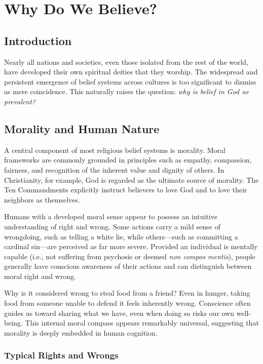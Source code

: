 \chapter{Why Do We Believe?}

\section{Introduction}

Nearly all nations and societies, even those isolated from the rest of the world, have developed their own spiritual deities that they worship. The widespread and persistent emergence of belief systems across cultures is too significant to dismiss as mere coincidence. This naturally raises the question: \emph{why is belief in God so prevalent?}

\section{Morality and Human Nature}

A central component of most religious belief systems is morality. Moral frameworks are commonly grounded in principles such as empathy, compassion, fairness, and recognition of the inherent value and dignity of others. In Christianity, for example, God is regarded as the ultimate source of morality. The Ten Commandments explicitly instruct believers to love God and to love their neighbors as themselves.

Humans with a developed moral sense appear to possess an intuitive understanding of right and wrong. Some actions carry a mild sense of wrongdoing, such as telling a white lie, while others---such as committing a cardinal sin---are perceived as far more severe. Provided an individual is mentally capable (i.e., not suffering from psychosis or deemed \emph{non compos mentis}), people generally have conscious awareness of their actions and can distinguish between moral right and wrong.

Why is it considered wrong to steal food from a friend? Even in hunger, taking food from someone unable to defend it feels inherently wrong. Conscience often guides us toward sharing what we have, even when doing so risks our own well-being. This internal moral compass appears remarkably universal, suggesting that morality is deeply embedded in human cognition.

\subsection*{Typical Rights and Wrongs}


